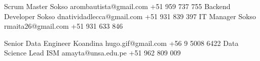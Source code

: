 %
%
%

\vspace{1em}
\begin{referees}
		 	{}
		 	{Scrum Master}
		 	{Sokso}
		 	{arombautista@gmail.com}
		 	{+51 959 737 755}
		 	{}
		 	{Backend Developer}
		 	{Sokso}
		 	{dnatividadlecca@gmail.com}
		 	{+51 931 839 397}
		 	{}
		 	{IT Manager}
		 	{Sokso}
		 	{rmaita26@gmail.com}
		 	{+51 931 633 846}
\par\bigskip
		 	{}
		 	{Senior Data Engineer}
		 	{Koandina}
		 	{hugo.gif@gmail.com}
		 	{+56 9 5008 6422}
		 	{}
		 	{Data Science Lead}
		 	{ISM}
		 	{amayta@unsa.edu.pe}
		 	{+51 962 809 009}
\end{referees}